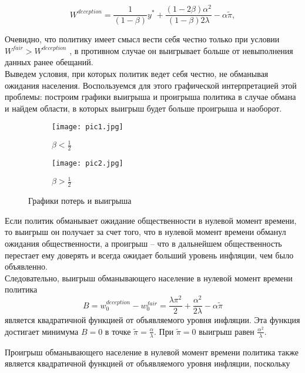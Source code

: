 \begin{equation}
W^{deception} = \frac{1}{(1-\beta)}y^*+\frac{(1-2\beta)\alpha^2}{(1-\beta)2\lambda}-\alpha\tilde{\pi},
\end{equation}

Очевидно, что политику имеет смысл вести себя честно только при условии $W^{fair} > W^{deception}$ , в противном случае он выигрывает больше от невыполнения данных ранее обещаний.
\\

Выведем условия, при которых политик ведет себя честно, не обманывая ожидания населения. Воспользуемся для этого графической интерпретацией этой проблемы: построим графики выигрыша и проигрыша политика в случае обмана и найдем области, в которых выигрыш будет больше проигрыша и наоборот.

\begin{figure}[h]
	
	\begin{subfigure}{0.5\textwidth}
		\texttt{[image: pic1.jpg]} 
		\caption{$\beta < \frac{1}{2}$}
		\label{fig:pic1}
	\end{subfigure}
	\begin{subfigure}{0.5\textwidth}
		\texttt{[image: pic2.jpg]}
		\caption{$\beta > \frac{1}{2}$}
		\label{fig:pic2}
	\end{subfigure}
	
	\caption{Графики потерь и выигрыша}
	\label{fig:image2}
\end{figure}

Если политик обманывает ожидание общественности в нулевой момент времени, то выигрыш он получает за счет того, что в нулевой момент времени обманул ожидания общественности, а проигрыш – что в дальнейшем общественность перестает ему доверять и всегда ожидает больший уровень инфляции, чем было объявленно.
\\

Следовательно, выигрыш обманывающего население в нулевой момент времени политика
\begin{equation}
B=w^{deception}_0 - w^{fair}_0 = \frac{\lambda\pi^2}{2}+\frac{\alpha^2}{2\lambda}-\alpha\tilde{\pi}
\end{equation}
является квадратичной функцией от объявляемого уровня инфляции. Эта функция достигает минимума $B=0$  в точке $\tilde{\pi}=\frac{\alpha}{\lambda}$. При $\tilde{\pi}=0$  выигрыш равен $\frac{\alpha^2}{\lambda}$.

Проигрыш обманывающего население в нулевой момент времени политика также является квадратичной функцией от объявляемого уровня инфляции, поскольку


